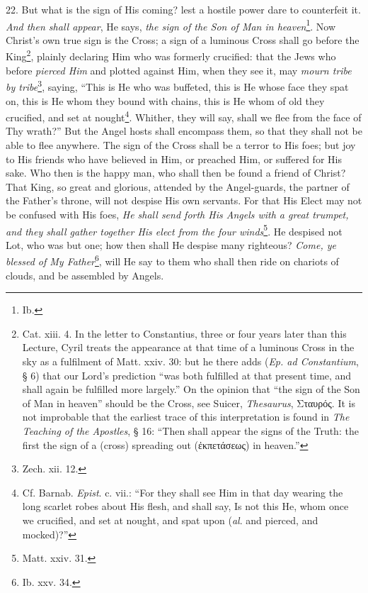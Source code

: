 22. But what is the sign of His coming? lest a hostile power dare to counterfeit it. \emph{And then shall appear}, He says, \emph{the sign of the Son of Man in heaven}\footnote{Ib.}. Now Christ’s own true sign is the Cross; a sign of a luminous Cross shall go before the King\footnote{Cat. xiii. 4. In the letter to Constantius, three or four years later than this Lecture, Cyril treats the appearance at that time of a luminous Cross in the sky as a fulfilment of Matt. xxiv. 30: but he there adds (\emph{Ep. ad Constantium}, § 6) that our Lord’s prediction “was both fulfilled at that present time, and shall again be fulfilled more largely.” On the opinion that “the sign of the Son of Man in heaven” should be the Cross, see Suicer, \emph{Thesaurus}, \textgreek{Σταυρός}. It is not improbable that the earliest trace of this interpretation is found in \emph{The Teaching of the Apostles}, § 16: “Then shall appear the signs of the Truth: the first the sign of a (cross) spreading out (\textgreek{ἐκπετάσεως}) in heaven.”}, plainly declaring Him who was formerly crucified: that the Jews who before \emph{pierced Him} and plotted against Him, when they see it, may \emph{mourn tribe by tribe}\footnote{Zech. xii. 12.}, saying, “This is He who was buffeted, this is He whose face they spat on, this is He whom they bound with chains, this is He whom of old they crucified, and set at nought\footnote{Cf. Barnab. \emph{Epist}. c. vii.: “For they shall see Him in that day wearing the long scarlet robes about His flesh, and shall say, Is not this He, whom once we crucified, and set at nought, and spat upon (\emph{al}. and pierced, and mocked)?”}. Whither, they will say, shall we flee from the face of Thy wrath?” But the Angel hosts shall encompass them, so that they shall not be able to flee anywhere. The sign of the Cross shall be a terror to His foes; but joy to His friends who have believed in Him, or preached Him, or suffered for His sake. Who then is the happy man, who shall then be found a friend of Christ? That King, so great and glorious, attended by the Angel-guards, the partner of the Father’s throne, will not despise His own servants. For that His Elect may not be confused with His foes, \emph{He shall send forth His Angels with a great trumpet, and they shall gather together His elect from the four winds}\footnote{Matt. xxiv. 31.}. He despised not Lot, who was but one; how then shall He despise many righteous? \emph{Come, ye blessed of My Father}\footnote{Ib. xxv. 34.}, will He say to them who shall then ride on chariots of clouds, and be assembled by Angels.

